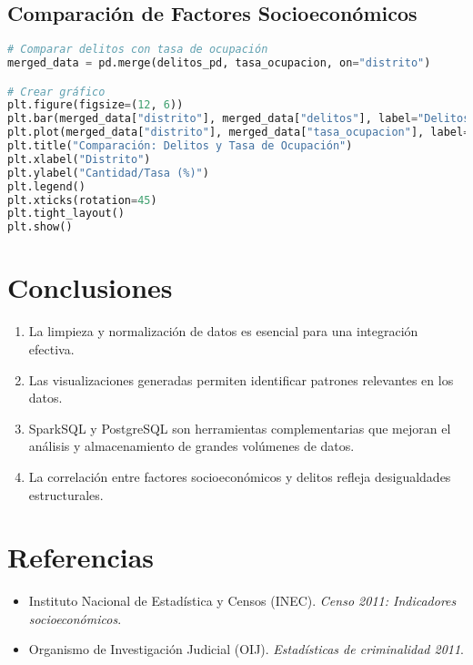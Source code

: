 \documentclass{article}
\begin{document}
\subsection{Comparación de Factores Socioeconómicos}

\begin{lstlisting}[language=Python, caption={Gráfico comparativo de factores socioeconómicos}]
# Comparar delitos con tasa de ocupación
merged_data = pd.merge(delitos_pd, tasa_ocupacion, on="distrito")

# Crear gráfico
plt.figure(figsize=(12, 6))
plt.bar(merged_data["distrito"], merged_data["delitos"], label="Delitos", alpha=0.7)
plt.plot(merged_data["distrito"], merged_data["tasa_ocupacion"], label="Tasa de Ocupación (%)", color="orange", marker="o")
plt.title("Comparación: Delitos y Tasa de Ocupación")
plt.xlabel("Distrito")
plt.ylabel("Cantidad/Tasa (%)")
plt.legend()
plt.xticks(rotation=45)
plt.tight_layout()
plt.show()
\end{lstlisting}

\section{Conclusiones}

\begin{enumerate}
    \item La limpieza y normalización de datos es esencial para una integración efectiva.
    \item Las visualizaciones generadas permiten identificar patrones relevantes en los datos.
    \item SparkSQL y PostgreSQL son herramientas complementarias que mejoran el análisis y almacenamiento de grandes volúmenes de datos.
    \item La correlación entre factores socioeconómicos y delitos refleja desigualdades estructurales.
\end{enumerate}

\section{Referencias}

\begin{itemize}
    \item Instituto Nacional de Estadística y Censos (INEC). \emph{Censo 2011: Indicadores socioeconómicos}.
    \item Organismo de Investigación Judicial (OIJ). \emph{Estadísticas de criminalidad 2011}.
\end{itemize}
\end{document}
